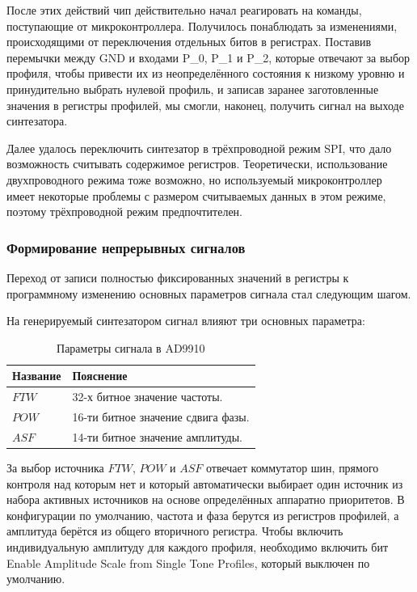 \documentclass[rusmathsym, eqnumwithinsec, amspack, hyperref]{bomgost}
\begin{document}
После этих действий чип действительно начал реагировать на команды, поступающие от микроконтроллера. Получилось понаблюдать за изменениями, происходящими от переключения отдельных битов в регистрах. Поставив перемычки между GND и входами P\_0, P\_1 и P\_2, которые отвечают за выбор профиля, чтобы привести их из неопределённого состояния к низкому уровню и принудительно выбрать нулевой профиль, и записав заранее заготовленные значения в регистры профилей, мы смогли, наконец, получить сигнал на выходе синтезатора.

Далее удалось переключить синтезатор в трёхпроводной режим SPI, что дало возможность считывать содержимое регистров. Теоретически, использование двухпроводного режима тоже возможно, но используемый микроконтроллер имеет некоторые проблемы с размером считываемых данных в этом режиме, поэтому трёхпроводной режим предпочтителен.

\subsubsection{Формирование непрерывных сигналов}

Переход от записи полностью фиксированных значений в регистры к программному изменению основных параметров сигнала стал следующим шагом.

На генерируемый синтезатором сигнал влияют три основных параметра:

\begin{table}[H]
\centering
\caption{Параметры сигнала в AD9910}
\label{tab:signal_parameters}
\begin{tabular}{|p{4cm}|p{8cm}|}
\hline 
\textbf{Название} & \textbf{Пояснение} \\ 
\hline 
$FTW$ & 32-х битное значение частоты. \\ 
\hline
$POW$ & 16-ти битное значение сдвига фазы. \\
\hline
$ASF$ & 14-ти битное значение амплитуды. \\
\hline
\end{tabular} 
\end{table}

За выбор источника $FTW$, $POW$ и $ASF$ отвечает коммутатор шин, прямого контроля над которым нет и который автоматически выбирает один источник из набора активных источников на основе определённых аппаратно приоритетов. В конфигурации по умолчанию, частота и фаза берутся из регистров профилей, а амплитуда берётся из общего вторичного регистра. Чтобы включить индивидуальную амплитуду для каждого профиля, необходимо включить бит Enable Amplitude Scale from Single Tone Profiles, который выключен по умолчанию.
\end{document}
